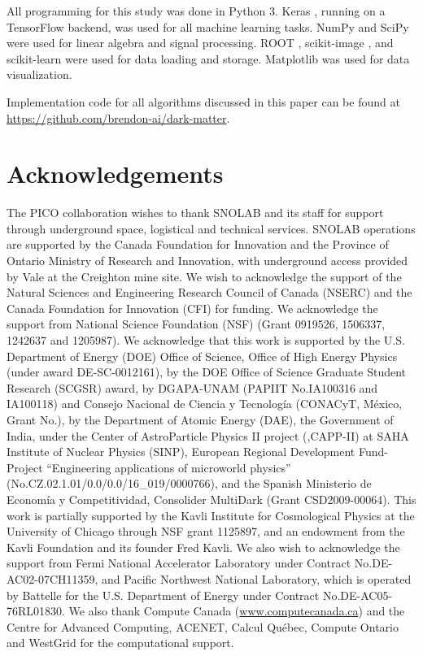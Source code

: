 \documentclass[10pt]{article}
\begin{document}
All programming for this study was done in Python 3. Keras \cite{keras}, running on a TensorFlow \cite{tensorflow} backend, was used for all machine learning tasks. NumPy \cite{numpy} and SciPy \cite{scipy} were used for linear algebra and signal processing. ROOT \cite{root}, scikit-image \cite{scikit-image}, and scikit-learn \cite{scikit-learn} were used for data loading and storage. Matplotlib \cite{matplotlib} was used for data visualization.

Implementation code for all algorithms discussed in this paper can be found at \url{https://github.com/brendon-ai/dark-matter}.

\section{Acknowledgements}

The PICO collaboration wishes to thank SNOLAB and its staff for support through underground space, logistical and technical services. SNOLAB operations are supported by the Canada Foundation for Innovation and the Province of Ontario Ministry of Research and Innovation, with underground access provided by Vale at the Creighton mine site. We wish to acknowledge the support of the Natural Sciences and Engineering Research Council of Canada (NSERC) and the Canada Foundation for Innovation (CFI) for funding. We acknowledge the support from National Science Foundation (NSF) (Grant 0919526, 1506337, 1242637 and 1205987). We acknowledge that this work is supported by the U.S. Department of Energy (DOE) Office of Science, Office of High Energy Physics (under award DE-SC-0012161), by the DOE Office of Science Graduate Student Research (SCGSR) award,  by DGAPA-UNAM (PAPIIT No.\:IA100316 and IA100118) and Consejo Nacional de Ciencia y Tecnolog\'ia (CONACyT, M\'exico, Grant No.), by the Department of Atomic Energy (DAE), the Government of India, under the Center of AstroParticle Physics II project (,CAPP-II) at SAHA Institute of Nuclear Physics (SINP), European Regional Development Fund-Project ``Engineering applications of microworld physics'' (No.\:CZ.02.1.01/0.0/0.0/16\_019/0000766), 
and the Spanish Ministerio de Econom\'ia y Competitividad, Consolider MultiDark (Grant CSD2009-00064). This work is partially supported by the Kavli Institute for Cosmological Physics at the University of Chicago through NSF grant 1125897, and an endowment from the Kavli Foundation and its founder Fred Kavli. We also wish to acknowledge the support from Fermi National Accelerator Laboratory under Contract No.\:DE-AC02-07CH11359, and Pacific Northwest National Laboratory, which is operated by Battelle for the U.S. Department of Energy under Contract No.\:DE-AC05-76RL01830. We also thank Compute Canada (\url{www.computecanada.ca}) and the Centre for Advanced Computing, ACENET, Calcul Qu\'ebec, Compute Ontario and WestGrid for the computational support.

\printbibliography
\end{document}
